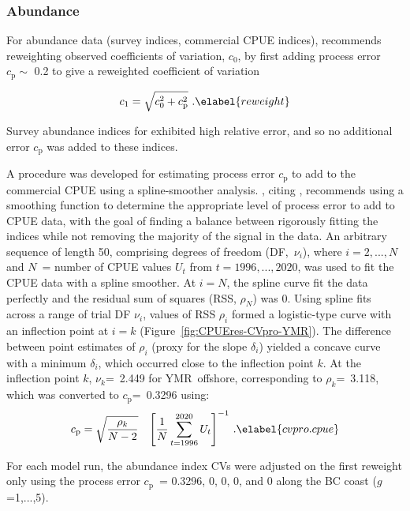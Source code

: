 \documentclass[11pt]{book}
\def\vsd{\vspace*{1ex}}     %
\renewcommand{\eb}{\vsd \vsd \begin{eqnarray}}
\renewcommand{\ee}{\end{eqnarray} \vsd }
\begin{document}
\subsubsection{Abundance} \label{sss:rwt_abund}

For abundance data (survey indices, commercial CPUE indices), \citet{Francis:2011} recommends reweighting observed coefficients of variation, $c_0$, by first adding process error $c_\mathrm{p} \sim$ 0.2 to give a reweighted coefficient of variation

\eb
c_1 = \sqrt{c_0^2 + c_\mathrm{p}^2}~. \elabel{reweight}
\ee

Survey abundance indices for \spc{} exhibited high relative error, and so no additional error $c_\mathrm{p}$ was added to these indices.

A procedure was developed for estimating process error $c_\mathrm{p}$ to add to the commercial CPUE using a spline-smoother analysis.
\citet{Francis:2011}, citing \citet{Clark-Hare:2006}, recommends using a smoothing function to determine the appropriate level of process error to add to CPUE data, with the goal of finding a balance between rigorously fitting the indices while not removing the majority of the signal in the data.
An arbitrary sequence of length 50, comprising degrees of freedom (DF,~$\nu_i$), where $i=2,...,N$ and $N$~= number of CPUE values $U_t$ from $t=1996,...,2020$, was used to fit the CPUE data with a spline smoother.
At $i=N$, the spline curve fit the data perfectly and the residual sum of squares (RSS, $\rho_N$) was 0.
Using spline fits across a range of trial DF $\nu_i$, values of RSS $\rho_i$ formed a logistic-type curve with an inflection point at $i=k$ (Figure~\ref{fig:CPUEres-CVpro-YMR}).
The difference between point estimates of $\rho_i$ (proxy for the slope $\delta_i$) yielded a concave curve with a minimum $\delta_i$, which occurred close to the inflection point $k$.
At the inflection point $k$, $\nu_k$=~2.449 for YMR~offshore, corresponding to $\rho_k$=~3.118, which was converted to $c_\mathrm{p}$=~0.3296 using:
\vspace{-0.25\baselineskip}%
\eb
c_\mathrm{p} = \sqrt{\dfrac{\rho_k}{N-2}}~~~{\left[ \dfrac{1}{N} \sum\limits_{t=1996}^{2020} U_t \right]}^{-1}~. \elabel{cvpro.cpue}
\ee

For each model run, the abundance index CVs were adjusted on the first reweight only using the process error $c_\mathrm{p}$~= 0.3296, 0, 0, 0, and 0 along the BC coast ($g$=1,...,5).
\end{document}
